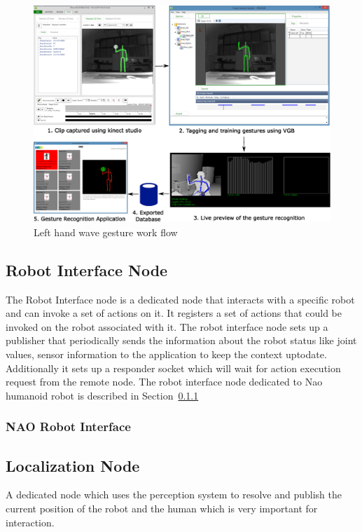 \begin{figure}
\centering
\includegraphics[width=\textwidth]{assets/gesture_recog_flow.eps}
\caption[Left hand wave gesture work flow]{Left hand wave gesture work flow}
\label{fig:gesture_waveleft}
\end{figure}
\subsection{Robot Interface Node} 
	The Robot Interface node is a dedicated node that interacts with a specific robot and can invoke a set of actions on it.  It registers a set of actions that could be invoked on the robot associated with it. The robot interface node sets up a publisher that periodically sends the information about the robot status like joint values, sensor information to the application to keep the context uptodate. Additionally it sets up a responder socket which will wait for action execution request from the remote node. The robot interface node dedicated to Nao humanoid robot is described in Section~\ref{sssec:nao_interface}
\subsubsection{NAO Robot Interface}
\label{sssec:nao_interface}
	
\subsection{Localization Node} A dedicated node which uses the perception system to resolve and publish the current position of the robot and the human which is very important for interaction.

